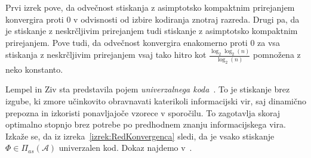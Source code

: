 \documentclass[fin1, tisk]{fmfdelo}
\newcommand{\A}{\mathcal{A}}
\theoremstyle{definition}
\begin{document}
Prvi izrek pove, da odvečnost stiskanja z asimptotsko kompaktnim prirejanjem konvergira proti $0$ v 
odvisnosti od izbire kodiranja znotraj razreda.
Drugi pa, da je stiskanje z neskrčljivim prirejanjem tudi stiskanje z asimptotsko kompaktnim 
prirejanjem. Pove tudi, da odvečnost konvergira enakomerno proti $0$ za vsa stiskanja z neskrčljivim 
prirejanjem vsaj tako hitro kot $\frac{\log_2 \log_2(n)}{\log_2(n)}$ pomnožena z neko konstanto.

Lempel in Ziv sta predstavila pojem \emph{univerzalnega koda}~\cite{LempelZiv1977, Ziv1978, LempelZiv1978}.
To je stiskanje brez izgube, ki zmore učinkovito obravnavati katerikoli informacijski vir, saj
dinamično prepozna in izkoristi ponavljajoče vzorece v sporočilu. To zagotavlja skoraj optimalno
stopnjo brez potrebe po predhodnem znanju informacijskega vira. Izkaže se, da iz 
izreka~\ref{izrek:RedKonvergenca} sledi, da je vsako stiskanje $\varPhi \in \varPi_{as}(\A)$ 
univerzalen kod. Dokaz najdemo v~\cite{KiefferYang2000}.
\end{document}
